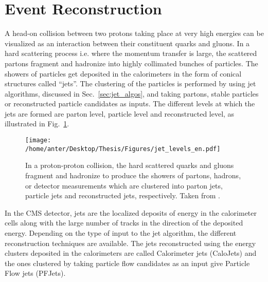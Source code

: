\section{Event Reconstruction}
A head-on collision between two protons taking place at very high energies can be visualized as an interaction between their constituent quarks and gluons. In a hard scattering process i.e. where the momentum transfer is large, the scattered partons fragment and hadronize into highly collimated bunches of particles. The showers of particles get deposited in the calorimeters in the form of conical structures called ``jets''. The clustering of the particles is performed by using jet algorithms, discussed in Sec.~\ref{sec:jet_algos}, and taking partons, stable particles or reconstructed particle candidates as inputs. The different levels at which the jets are formed are parton level, particle level and reconstructed level, as illustrated in Fig.~\ref{fig:jets}. %
\begin{figure}[!h]
\begin{center}
\vspace*{3mm} 
\hspace*{-5mm}
\texttt{[image: /home/anter/Desktop/Thesis/Figures/jet\_levels\_en.pdf]}\\
\vspace*{4mm}
\caption{In a proton-proton collision, the hard scattered quarks and gluons fragment and hadronize to produce the showers of partons, hadrons, or detector measurements which are clustered into parton jets, particle jets and reconstructed jets, respectively. Taken from \cite{Schorner-Sadenius:2015cga}.}
\label{fig:jets}
\end{center}
\end{figure}
In the CMS detector, jets are the localized deposits of energy in the calorimeter cells along with the large number of tracks in the direction of the deposited energy. Depending on the type of input to the jet algorithm, the different reconstruction techniques are available. The jets reconstructed using the energy clusters deposited in the calorimeters are called Calorimeter jets (CaloJets) and the ones clustered by taking particle flow candidates as an input give Particle Flow jets (PFJets). 

